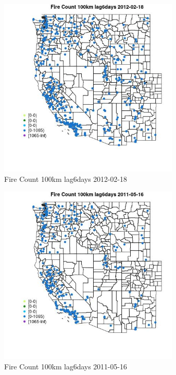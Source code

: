 \begin{figure} 
\centering  
\includegraphics[width=0.77\textwidth]{Code_Outputs/Report_ML_input_PM25_Step4_part_f_de_duplicated_aves_prioritize_24hr_obswNAs_MapObsFire_Count_100km_lag6days2012-02-18.jpg} 
\caption{\label{fig:Report_ML_input_PM25_Step4_part_f_de_duplicated_aves_prioritize_24hr_obswNAsMapObsFire_Count_100km_lag6days2012-02-18}Fire Count 100km lag6days 2012-02-18} 
\end{figure} 
 

\begin{figure} 
\centering  
\includegraphics[width=0.77\textwidth]{Code_Outputs/Report_ML_input_PM25_Step4_part_f_de_duplicated_aves_prioritize_24hr_obswNAs_MapObsFire_Count_100km_lag6days2011-05-16.jpg} 
\caption{\label{fig:Report_ML_input_PM25_Step4_part_f_de_duplicated_aves_prioritize_24hr_obswNAsMapObsFire_Count_100km_lag6days2011-05-16}Fire Count 100km lag6days 2011-05-16} 
\end{figure} 
 

